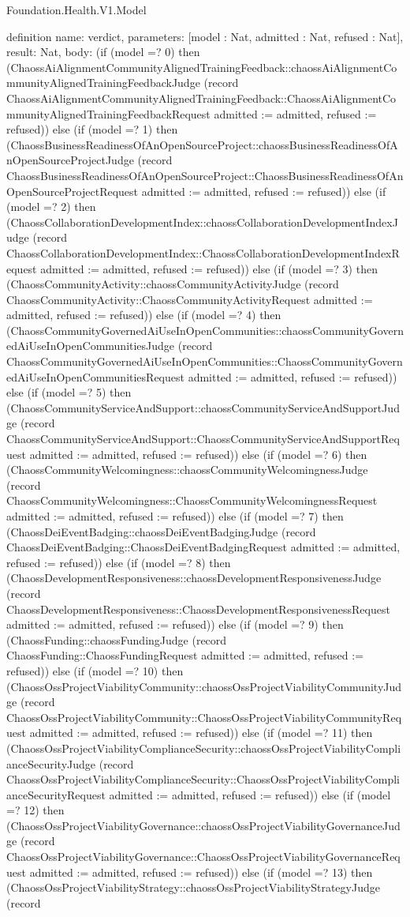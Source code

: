 \begin{lexlean}{Foundation.Health.V1.Model}
\begin{semanticmodule}
definition{
  name: verdict,
  parameters: [model : Nat, admitted : Nat, refused : Nat],
  result: Nat,
  body: (if (model =? 0) then (ChaossAiAlignmentCommunityAlignedTrainingFeedback::chaossAiAlignmentCommunityAlignedTrainingFeedbackJudge (record ChaossAiAlignmentCommunityAlignedTrainingFeedback::ChaossAiAlignmentCommunityAlignedTrainingFeedbackRequest {admitted := admitted, refused := refused})) else (if (model =? 1) then (ChaossBusinessReadinessOfAnOpenSourceProject::chaossBusinessReadinessOfAnOpenSourceProjectJudge (record ChaossBusinessReadinessOfAnOpenSourceProject::ChaossBusinessReadinessOfAnOpenSourceProjectRequest {admitted := admitted, refused := refused})) else (if (model =? 2) then (ChaossCollaborationDevelopmentIndex::chaossCollaborationDevelopmentIndexJudge (record ChaossCollaborationDevelopmentIndex::ChaossCollaborationDevelopmentIndexRequest {admitted := admitted, refused := refused})) else (if (model =? 3) then (ChaossCommunityActivity::chaossCommunityActivityJudge (record ChaossCommunityActivity::ChaossCommunityActivityRequest {admitted := admitted, refused := refused})) else (if (model =? 4) then (ChaossCommunityGovernedAiUseInOpenCommunities::chaossCommunityGovernedAiUseInOpenCommunitiesJudge (record ChaossCommunityGovernedAiUseInOpenCommunities::ChaossCommunityGovernedAiUseInOpenCommunitiesRequest {admitted := admitted, refused := refused})) else (if (model =? 5) then (ChaossCommunityServiceAndSupport::chaossCommunityServiceAndSupportJudge (record ChaossCommunityServiceAndSupport::ChaossCommunityServiceAndSupportRequest {admitted := admitted, refused := refused})) else (if (model =? 6) then (ChaossCommunityWelcomingness::chaossCommunityWelcomingnessJudge (record ChaossCommunityWelcomingness::ChaossCommunityWelcomingnessRequest {admitted := admitted, refused := refused})) else (if (model =? 7) then (ChaossDeiEventBadging::chaossDeiEventBadgingJudge (record ChaossDeiEventBadging::ChaossDeiEventBadgingRequest {admitted := admitted, refused := refused})) else (if (model =? 8) then (ChaossDevelopmentResponsiveness::chaossDevelopmentResponsivenessJudge (record ChaossDevelopmentResponsiveness::ChaossDevelopmentResponsivenessRequest {admitted := admitted, refused := refused})) else (if (model =? 9) then (ChaossFunding::chaossFundingJudge (record ChaossFunding::ChaossFundingRequest {admitted := admitted, refused := refused})) else (if (model =? 10) then (ChaossOssProjectViabilityCommunity::chaossOssProjectViabilityCommunityJudge (record ChaossOssProjectViabilityCommunity::ChaossOssProjectViabilityCommunityRequest {admitted := admitted, refused := refused})) else (if (model =? 11) then (ChaossOssProjectViabilityComplianceSecurity::chaossOssProjectViabilityComplianceSecurityJudge (record ChaossOssProjectViabilityComplianceSecurity::ChaossOssProjectViabilityComplianceSecurityRequest {admitted := admitted, refused := refused})) else (if (model =? 12) then (ChaossOssProjectViabilityGovernance::chaossOssProjectViabilityGovernanceJudge (record ChaossOssProjectViabilityGovernance::ChaossOssProjectViabilityGovernanceRequest {admitted := admitted, refused := refused})) else (if (model =? 13) then (ChaossOssProjectViabilityStrategy::chaossOssProjectViabilityStrategyJudge (record }
\end{semanticmodule}
\end{lexlean}
